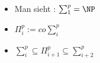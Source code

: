 \begin{frame}
\begin{columns}
\begin{overprint}
	\end{overprint}
	\begin{itemize}
		  \item Man sieht : $\sum_{1}^{p} = \NP$
		  \item $\Pi_{i}^{p} := co\sum_{i}^{p}$
		  \item $\sum_{i}^{p} \subseteq \Pi_{i+1}^{p} \subseteq \sum_{i+2}^{p}$
		\end{itemize}
	\end{columns}
\end{frame}
